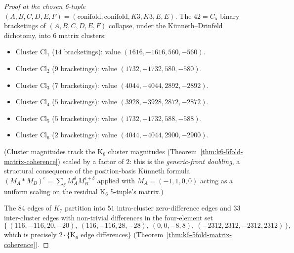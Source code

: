 \begin{proof}[Proof at the chosen 6-tuple
 $(A, B, C, D, E, F) = (\mathrm{conifold},
 \mathrm{conifold}, K3, K3, E, E)$]
The $42 = C_5$ binary bracketings of $(A, B, C, D, E, F)$ collapse,
under the K\"unneth--Drinfeld dichotomy, into $6$ matrix clusters:
\begin{itemize}
\item Cluster $\mathrm{Cl}_1$ \textup{(}$14$ bracketings\textup{):}
 value $(1616, -1616, 560, -560)$.
\item Cluster $\mathrm{Cl}_2$ \textup{(}$9$ bracketings\textup{):}
 value $(1732, -1732, 580, -580)$.
\item Cluster $\mathrm{Cl}_3$ \textup{(}$7$ bracketings\textup{):}
 value $(4044, -4044, 2892, -2892)$.
\item Cluster $\mathrm{Cl}_4$ \textup{(}$5$ bracketings\textup{):}
 value $(3928, -3928, 2872, -2872)$.
\item Cluster $\mathrm{Cl}_5$ \textup{(}$5$ bracketings\textup{):}
 value $(1732, -1732, 588, -588)$.
\item Cluster $\mathrm{Cl}_6$ \textup{(}$2$ bracketings\textup{):}
 value $(4044, -4044, 2900, -2900)$.
\end{itemize}
\textup{(}Cluster magnitudes track the K$_6$ cluster magnitudes
\textup{(}Theorem~\ref{thm:k6-5fold-matrix-coherence}\textup{)} scaled
by a factor of $2$: this is the \emph{generic-front doubling}, a
structural consequence of the position-basis K\"unneth formula
$(M_A \mathbin{\ast} M_B)^\epsilon = \sum_\delta M_A^\delta M_B^{\epsilon + \delta}$
applied with $M_A = (-1, 1, 0, 0)$ acting as a uniform scaling on the
residual K$_6$ 5-tuple's matrix.\textup{)}

The $84$ edges of $K_7$ partition into $51$ intra-cluster zero-difference
edges and $33$ inter-cluster edges with non-trivial differences in the
four-element set
\[
 \bigl\{\,(116, -116, 20, -20),\ (116, -116, 28, -28),\ (0, 0, -8, 8),\
 (-2312, 2312, -2312, 2312)\,\bigr\},
\]
which is precisely $2 \cdot \{$K$_6$ edge differences$\}$
\textup{(}Theorem~\ref{thm:k6-5fold-matrix-coherence}\textup{).}


\end{proof}
